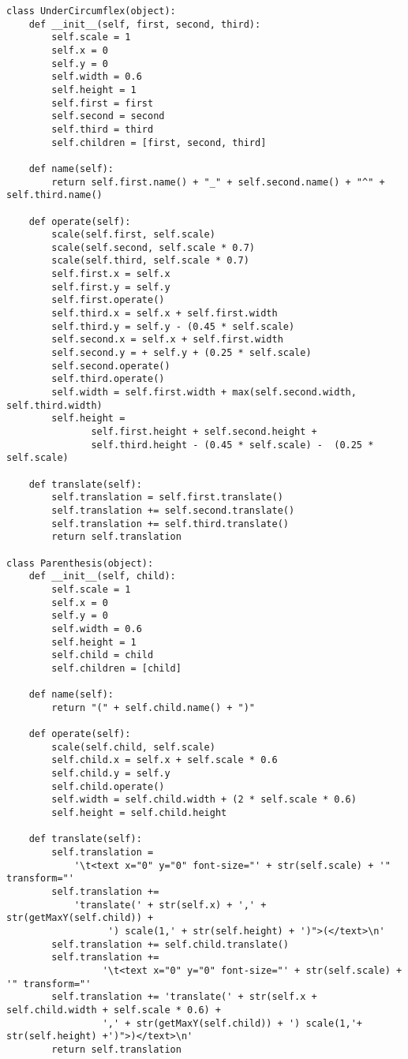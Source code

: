 \begin{verbatim}
class UnderCircumflex(object):
    def __init__(self, first, second, third):
        self.scale = 1
        self.x = 0
        self.y = 0
        self.width = 0.6
        self.height = 1
        self.first = first
        self.second = second
        self.third = third
        self.children = [first, second, third]

    def name(self):
        return self.first.name() + "_" + self.second.name() + "^" + self.third.name()

    def operate(self):
        scale(self.first, self.scale)
        scale(self.second, self.scale * 0.7)
        scale(self.third, self.scale * 0.7)
        self.first.x = self.x
        self.first.y = self.y
        self.first.operate()
        self.third.x = self.x + self.first.width
        self.third.y = self.y - (0.45 * self.scale)
        self.second.x = self.x + self.first.width
        self.second.y = + self.y + (0.25 * self.scale)
        self.second.operate()
        self.third.operate()
        self.width = self.first.width + max(self.second.width, self.third.width)
        self.height = 
               self.first.height + self.second.height + 
               self.third.height - (0.45 * self.scale) -  (0.25 * self.scale)

    def translate(self):
        self.translation = self.first.translate()
        self.translation += self.second.translate()
        self.translation += self.third.translate()
        return self.translation        

class Parenthesis(object):
    def __init__(self, child):
        self.scale = 1
        self.x = 0
        self.y = 0
        self.width = 0.6
        self.height = 1
        self.child = child
        self.children = [child]
        
    def name(self):
        return "(" + self.child.name() + ")"

    def operate(self):
        scale(self.child, self.scale)
        self.child.x = self.x + self.scale * 0.6
        self.child.y = self.y
        self.child.operate()
        self.width = self.child.width + (2 * self.scale * 0.6)
        self.height = self.child.height

    def translate(self):
        self.translation = 
            '\t<text x="0" y="0" font-size="' + str(self.scale) + '" transform="'
        self.translation += 
            'translate(' + str(self.x) + ',' + str(getMaxY(self.child)) +
                  ') scale(1,' + str(self.height) + ')">(</text>\n'
        self.translation += self.child.translate()
        self.translation += 
                 '\t<text x="0" y="0" font-size="' + str(self.scale) + '" transform="'
        self.translation += 'translate(' + str(self.x + self.child.width + self.scale * 0.6) + 
                 ',' + str(getMaxY(self.child)) + ') scale(1,'+ str(self.height) +')">)</text>\n'
        return self.translation


\end{verbatim}
